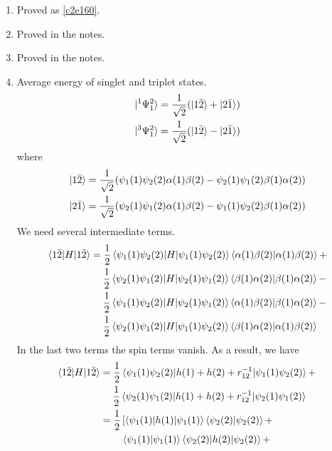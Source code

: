 \begin{enumerate}
\item\label{c2p37} Proved as \eqref{c2e160}.

\item\label{c2p38} Proved in the notes.
\item\label{c2p39} Proved in the notes.

\item\label{c2p40} Average energy of singlet and triplet states.
\[
\begin{aligned}
\ket{^1\Psi_1^2} &= \frac{1}{\sqrt{2}}(\ket{1\bar{2}} + \ket{2\bar{1}}) \\
\ket{^3\Psi_1^2} &= \frac{1}{\sqrt{2}}(\ket{1\bar{2}} - \ket{2\bar{1}}) 
\end{aligned}
\]
where
\[
\begin{aligned}
\ket{1\bar{2}} &= \frac{1}{\sqrt{2}}(\psi_1(1)\psi_2(2)\alpha(1)\beta(2) -
\psi_2(1)\psi_1(2)\beta(1)\alpha(2)) \\
\ket{2\bar{1}} &= \frac{1}{\sqrt{2}}(\psi_2(1)\psi_1(2)\alpha(1)\beta(2) -
\psi_1(1)\psi_2(2)\beta(1)\alpha(2)) 
\end{aligned}
\]
We need several intermediate terms.
\[
\begin{aligned}
\braket{1\bar{2}|H|1\bar{2}} &= 
\frac{1}{2}\braket{\psi_1(1)\psi_2(2)|H|\psi_1(1)\psi_2(2)}
           \braket{\alpha(1)\beta(2)|\alpha(1)\beta(2)} + \\
&\quad\;\frac{1}{2}\braket{\psi_2(1)\psi_1(2)|H|\psi_2(1)\psi_1(2)}
           \braket{\beta(1)\alpha(2)|\beta(1)\alpha(2)} - \\
&\quad\;\frac{1}{2}\braket{\psi_1(1)\psi_2(2)|H|\psi_2(1)\psi_1(2)}
           \braket{\alpha(1)\beta(2)|\beta(1)\alpha(2)} - \\
&\quad\;\frac{1}{2}\braket{\psi_2(1)\psi_1(2)|H|\psi_1(1)\psi_2(2)}
           \braket{\beta(1)\alpha(2)|\alpha(1)\beta(2)} 
\end{aligned}
\]
In the last two terms the spin terms vanish. As a result, we have
\[
\begin{aligned}
\braket{1\bar{2}|H|1\bar{2}} &= 
\frac{1}{2}\braket{\psi_1(1)\psi_2(2)|h(1)+h(2)+r_{12}^{-1}|\psi_1(1)\psi_2(2)}
 + \\
&\quad\;\frac{1}{2}\braket{\psi_2(1)\psi_1(2)|h(1)+h(2)+r_{12}^{-1}|
\psi_2(1)\psi_1(2)} \\
&=\frac{1}{2}\left[\braket{\psi_1(1)|h(1)|\psi_1(1)}\braket{\psi_2(2)|\psi_2(2)}
+ \right. \\
&\quad\quad\left.\braket{\psi_1(1)|\psi_1(1)}\braket{\psi_2(2)|h(2)|\psi_2(2)}
+ \right. \\

\end{aligned}\]
\end{enumerate}
